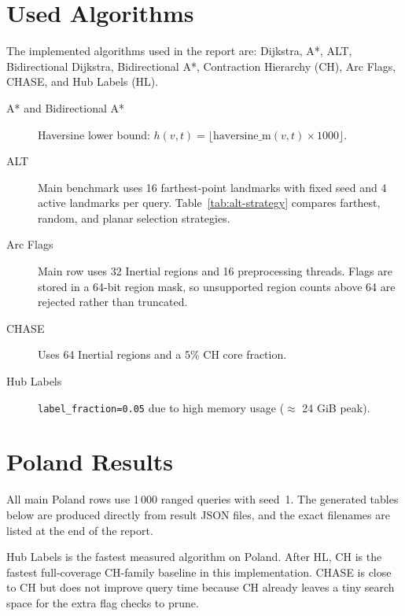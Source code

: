 \documentclass[11pt,a4paper]{article}
\begin{document}
\section{Used Algorithms}
\label{sec:algorithms}

The implemented algorithms used in the report are: Dijkstra, A*, ALT,
Bidirectional Dijkstra, Bidirectional A*, Contraction Hierarchy (CH),
Arc Flags, CHASE, and Hub Labels (HL).

\begin{description}
  \item[A* and Bidirectional A*]
    Haversine lower bound:
    $h(v,t)=\lfloor \mathrm{haversine\_m}(v,t)\times1000\rfloor$.

  \item[ALT]
    Main benchmark uses 16 farthest-point landmarks with fixed seed and 4 active
    landmarks per query.  Table~\ref{tab:alt-strategy} compares farthest, random,
    and planar selection strategies.

  \item[Arc Flags]
    Main row uses 32 Inertial regions and 16 preprocessing threads.  Flags are
    stored in a 64-bit region mask, so unsupported region counts above 64 are
    rejected rather than truncated.

  \item[CHASE]
    Uses 64 Inertial regions and a 5\% CH core fraction.

  \item[Hub Labels]
    \texttt{label\_fraction=0.05} due to high memory usage ($\approx$ 24 GiB peak).
\end{description}

\section{Poland Results}
\label{sec:poland}

All main Poland rows use 1\,000 ranged queries with seed~1.  The generated tables
below are produced directly from result JSON files, and the exact filenames are
listed at the end of the report.







Hub Labels is the fastest measured algorithm on Poland.  After HL, CH is the
fastest full-coverage CH-family baseline in this implementation.  CHASE is close
to CH but does not improve query time because CH already leaves a tiny search
space for the extra flag checks to prune.
\end{document}
